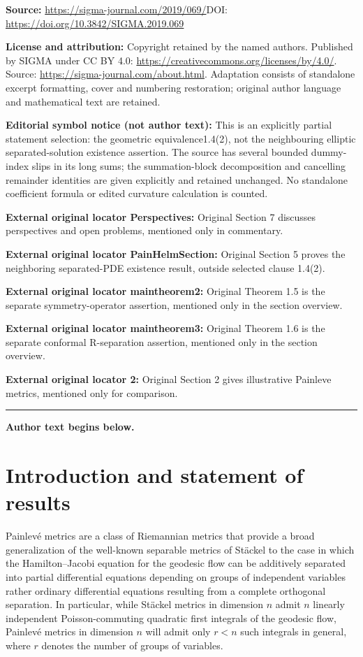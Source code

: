 \documentclass[11pt]{article}
\numberwithin{equation}{section}
\begin{document}
\noindent\textbf{Source:} \url{https://sigma-journal.com/2019/069/}\quad DOI: \url{https://doi.org/10.3842/SIGMA.2019.069}\par
\noindent\textbf{License and attribution:} Copyright retained by the named authors. Published by SIGMA under CC BY 4.0: \url{https://creativecommons.org/licenses/by/4.0/}. Source: \url{https://sigma-journal.com/about.html}. Adaptation consists of standalone excerpt formatting, cover and numbering restoration; original author language and mathematical text are retained.\par
\noindent\textbf{Editorial symbol notice (not author text):} This is an explicitly partial statement selection: the geometric equivalence1.4(2), not the neighbouring elliptic separated-solution existence assertion. The source has several bounded dummy-index slips in its long sums; the summation-block decomposition and cancelling remainder identities are given explicitly and retained unchanged. No standalone coefficient formula or edited curvature calculation is counted.\par
\noindent\textbf{External original locator Perspectives:} Original Section 7 discusses perspectives and open problems, mentioned only in commentary.\par
\noindent\textbf{External original locator PainHelmSection:} Original Section 5 proves the neighboring separated-PDE existence result, outside selected clause 1.4(2).\par
\noindent\textbf{External original locator maintheorem2:} Original Theorem 1.5 is the separate symmetry-operator assertion, mentioned only in the section overview.\par
\noindent\textbf{External original locator maintheorem3:} Original Theorem 1.6 is the separate conformal R-separation assertion, mentioned only in the section overview.\par
\noindent\textbf{External original locator 2:} Original Section 2 gives illustrative Painleve metrics, mentioned only for comparison.\par
\medskip\hrule\medskip\noindent\textbf{Author text begins below.}\par
\setcounter{section}{0}
\setcounter{subsection}{0}
\setcounter{subsubsection}{0}
\setcounter{Theorem}{0}
\setcounter{equation}{0}
\section{Introduction and statement of results}
Painlev\'e metrics \cite{Pain1897, Per1990} are a class of Riemannian metrics that provide a broad generalization of the well-known separable metrics of St\"ackel \cite{Eis1934, Sta1897} to the case in which the Hamilton--Jacobi equation for the geodesic flow can be additively separated into partial differential equations depending on groups of independent variables rather ordinary differential equations resulting from a complete orthogonal separation. In particular, while St\"ackel metrics in dimension $n$ admit $n$ linearly independent Poisson-commuting quadratic first integrals of the geodesic flow, Painlev\'e metrics in dimension $n$ will admit only $r<n$ such integrals in general, where $r$ denotes the number of groups of variables.
\end{document}
